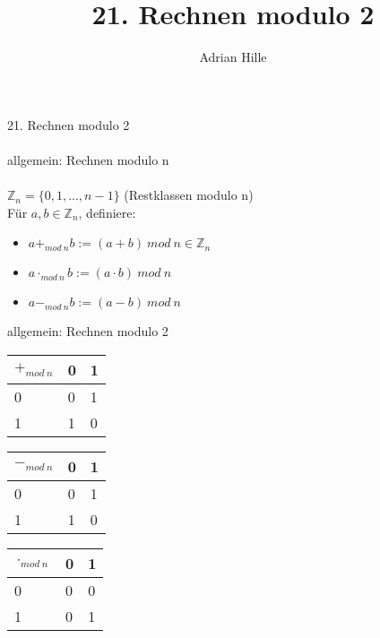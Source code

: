 \documentclass{scrartcl}
\title{21. Rechnen modulo 2}
\author{Adrian Hille}
\begin{document}
\Large 21. Rechnen modulo 2\\
\\
\normalsize
\large allgemein: Rechnen modulo n\\
\\
\normalsize
$\mathbb{Z}_n = \{0, 1, ..., n-1\}$ (Restklassen modulo n)\\
F\"ur $a, b \in \mathbb{Z}_n$, definiere:\\
\begin{itemize}
	\item $a +_{mod~n} b := (a+b)~mod~n \in \mathbb{Z}_n$
	\item	$a \cdot_{mod~n} b := (a\cdot b)~mod~n$
	\item $a -_{mod~n} b := (a-b)~mod~n$
\end{itemize}

\large allgemein: Rechnen modulo 2\\
\normalsize
\begin{table}[H]
\begin{tabular}{l|l|l}
	$+_{mod~n} $ & 0 & 1\\
	\hline
	0 & 0 & 1\\
	\hline
	1 & 1 & 0\\
\end{tabular}
\end{table}
\begin{table}[H]
\begin{tabular}{l|l|l}
	$-_{mod~n} $ & 0 & 1\\
	\hline
	0 & 0 & 1\\
	\hline
	1 & 1 & 0\\
\end{tabular}
\end{table}
\begin{table}[H]
\begin{tabular}{l|l|l}
	$\cdot_{mod~n} $ & 0 & 1\\
	\hline
	0 & 0 & 0\\
	\hline
	1 & 0 & 1\\
\end{tabular}
\end{table}
\end{document}
